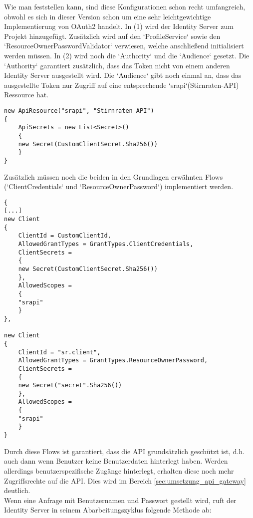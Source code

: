 Wie man feststellen kann, sind diese Konfigurationen schon recht umfangreich, obwohl es sich in dieser Version schon um eine sehr leichtgewichtige Implementierung von OAuth2 handelt. In (1) wird der Identity Server zum Projekt hinzugefügt. Zusätzlich wird auf den `ProfileService` sowie den `ResourceOwnerPasswordValidator` verwiesen, welche anschließend initialisiert werden müssen. In (2) wird noch die `Authority` und die `Audience` gesetzt. Die `Authority` garantiert zusätzlich, dass das Token nicht von einem anderen Identity Server ausgestellt wird. Die `Audience` gibt noch einmal an, dass das ausgestellte Token nur Zugriff auf eine entsprechende `srapi`(Stirnraten-API) Ressource hat. 

\begin{verbatim}
new ApiResource("srapi", "Stirnraten API")
{
    ApiSecrets = new List<Secret>()
    {
    new Secret(CustomClientSecret.Sha256())
    }
}
\end{verbatim}

Zusätzlich müssen noch die beiden in den Grundlagen erwähnten Flows (`ClientCredentials` und `ResourceOwnerPassword`) implementiert werden. 

\begin{verbatim}{
[...]
new Client
{
    ClientId = CustomClientId,
    AllowedGrantTypes = GrantTypes.ClientCredentials,
    ClientSecrets =
    {
    new Secret(CustomClientSecret.Sha256())
    },
    AllowedScopes =
    {
    "srapi"
    }
},

new Client
{
    ClientId = "sr.client",
    AllowedGrantTypes = GrantTypes.ResourceOwnerPassword,
    ClientSecrets =
    {
    new Secret("secret".Sha256())
    },
    AllowedScopes =
    {
    "srapi"
    }
}

\end{verbatim}

Durch diese Flows ist garantiert, dass die API grundsätzlich geschützt ist, d.h. auch dann wenn Benutzer keine Benutzerdaten hinterlegt haben. Werden allerdings benutzerspezifische Zugänge hinterlegt, erhalten diese noch mehr Zugriffsrechte auf die API. Dies wird im Bereich \ref{sec:umsetzung_api_gateway} deutlich. \\

Wenn eine Anfrage mit Benutzernamen und Passwort gestellt wird, ruft der Identity Server in seinem Abarbeitungszyklus folgende Methode ab: 

